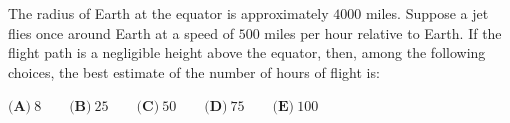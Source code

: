 The radius of Earth at the equator is approximately $4000$ miles. Suppose a jet flies once around Earth at a speed of $500$ miles per hour relative to Earth. If the flight path is a negligible height above the equator, then, among the following choices, the best estimate of the number of hours of flight is:

$\textbf{(A)}\ 8 \qquad\textbf{(B)}\ 25 \qquad\textbf{(C)}\ 50 \qquad\textbf{(D)}\ 75 \qquad\textbf{(E)}\ 100$
